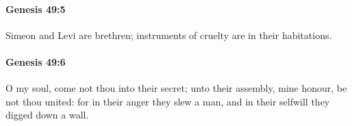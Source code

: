 		\paragraph{Genesis 49:5} %
			\label{GENESIS-49-5}

			Simeon and Levi are brethren; instruments of cruelty are in their habitations.


		\paragraph{Genesis 49:6} %
			\label{GENESIS-49-6}

			O my soul, come not thou into their secret; unto their assembly, mine honour, be not thou united: for in their anger they slew a man, and in their selfwill they digged down a wall.


